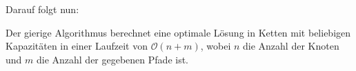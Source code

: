 Darauf folgt nun:

\begin{theorem}
    Der gierige Algorithmus berechnet eine optimale Lösung in Ketten mit beliebigen Kapazitäten in einer Laufzeit von
    $\mathcal O(n+m)$, wobei $n$ die Anzahl der Knoten und $m$ die Anzahl der gegebenen Pfade ist.
\end{theorem}











